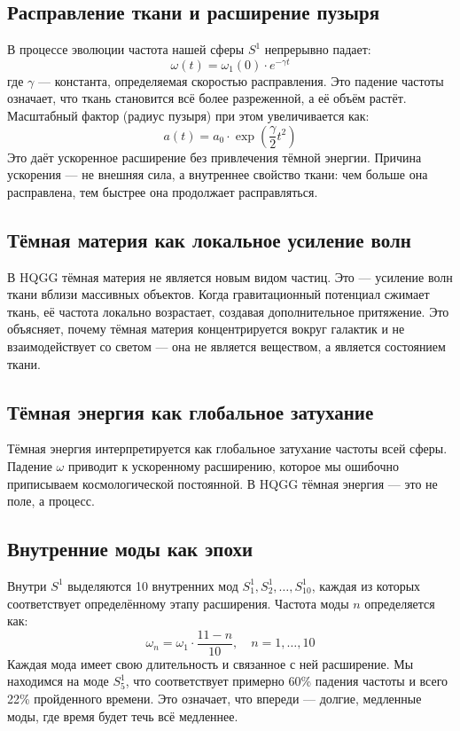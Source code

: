 \documentclass[12pt,a4paper]{article}
\begin{document}
\subsection{Расправление ткани и расширение пузыря}

В процессе эволюции частота нашей сферы \( S^1 \) непрерывно падает:
\[
\omega(t) = \omega_1(0) \cdot e^{-\gamma t}
\]
где \(\gamma\) — константа, определяемая скоростью расправления. Это падение частоты означает, что ткань становится всё более разреженной, а её объём растёт. Масштабный фактор (радиус пузыря) при этом увеличивается как:
\[
a(t) = a_0 \cdot \exp\left(\frac{\gamma}{2} t^2\right)
\]
Это даёт ускоренное расширение без привлечения тёмной энергии. Причина ускорения — не внешняя сила, а внутреннее свойство ткани: чем больше она расправлена, тем быстрее она продолжает расправляться.

\subsection{Тёмная материя как локальное усиление волн}

В HQGG тёмная материя не является новым видом частиц. Это — усиление волн ткани вблизи массивных объектов. Когда гравитационный потенциал сжимает ткань, её частота локально возрастает, создавая дополнительное притяжение. Это объясняет, почему тёмная материя концентрируется вокруг галактик и не взаимодействует со светом — она не является веществом, а является состоянием ткани.

\subsection{Тёмная энергия как глобальное затухание}

Тёмная энергия интерпретируется как глобальное затухание частоты всей сферы. Падение \(\omega\) приводит к ускоренному расширению, которое мы ошибочно приписываем космологической постоянной. В HQGG тёмная энергия — это не поле, а процесс.

\subsection{Внутренние моды как эпохи}

Внутри \( S^1 \) выделяются 10 внутренних мод \( S^1_1, S^1_2, \dots, S^1_{10} \), каждая из которых соответствует определённому этапу расширения. Частота моды \( n \) определяется как:
\[
\omega_n = \omega_1 \cdot \frac{11 - n}{10}, \quad n = 1, \dots, 10
\]
Каждая мода имеет свою длительность и связанное с ней расширение. Мы находимся на моде \( S^1_5 \), что соответствует примерно 60\% падения частоты и всего 22\% пройденного времени. Это означает, что впереди — долгие, медленные моды, где время будет течь всё медленнее.
\end{document}
